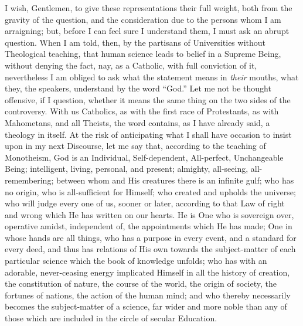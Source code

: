 I wish, Gentlemen, to give these representations their full weight,
both from the gravity of the question, and the consideration due to
the persons whom I am arraigning; but, before I can feel sure I
understand them, I must ask an abrupt question. When I am told, then,
by the partisans of Universities without Theological teaching, that
human science leads to belief in a Supreme Being, without denying the
fact, nay, as a Catholic, with full conviction of it, nevertheless I
am obliged to ask what the statement means in \emph{their} mouths,
what they, the speakers, understand by the word ``God.''
Let me not be thought offensive, if I question, whether it means the
same thing on the two sides of the controversy. With us Catholics, as
with the first race of Protestants, as with Mahometans, and all
Theists, the word contains, as I have already said, a theology in
itself. At the risk of anticipating what I shall have occasion to
insist upon in my next Discourse, let me say that, according to the
teaching of Monotheism, God is an Individual, Self-dependent,
All-perfect, Unchangeable Being; intelligent, living, personal, and
present; almighty, all-seeing, all-remembering; between whom and His
creatures there is an infinite gulf; who has no origin, who is
all-sufficient for Himself; who created and upholds the universe; who
will judge every one of us, sooner or later, according to that Law of
right and wrong which He has written on our hearts. He is One who is
sovereign over, operative amidst, independent of, the appointments
which He has made; One in whose hands are all things, who has a
purpose in every event, and a standard for every deed, and thus has
relations of His own towards the subject-matter of each particular
science which the book of knowledge unfolds; who has with an adorable,
never-ceasing energy implicated Himself in all the history of
creation, the constitution of nature, the course of the world, the
origin of society, the fortunes of nations, the action of the human
mind; and who thereby necessarily becomes the subject-matter of a
science, far wider and more noble than any of those which are included
in the circle of secular Education.

